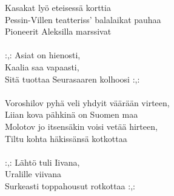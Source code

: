             Kasakat lyö eteisessä korttia \\
            Pessin-Villen teatteriss' balalaikat pauhaa \\
            Pioneerit Aleksilla marssivat \\
\hspace{10mm} \\
            :,: Asiat on hienosti, \\
            Kaalia saa vapaasti, \\
            Sitä tuottaa Seurasaaren kolhoosi :,: \\
\hspace{10mm} \\
            Voroshilov pyhä veli yhdyit väärään virteen, \\
            Liian kova pähkinä on Suomen maa \\
            Molotov jo itsensäkin voisi vetää hirteen, \\
            Tiltu kohta häkissänsä kotkottaa \\
\hspace{10mm} \\
            :,: Lähtö tuli Iivana, \\
            Uralille viivana \\
            Surkeasti toppahousut rotkottaa :,:  \\

